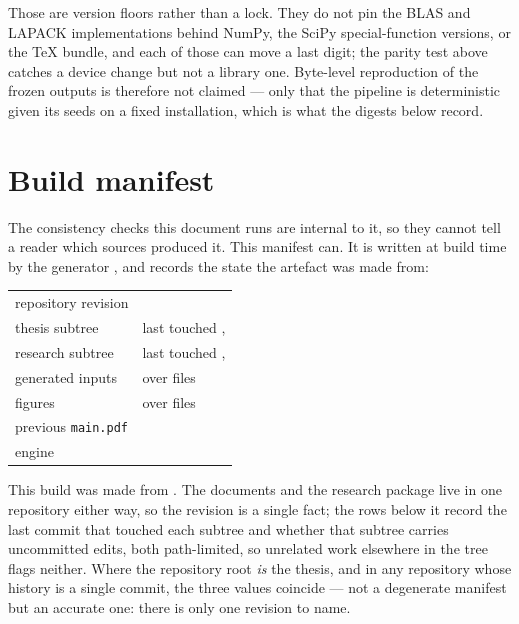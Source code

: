 Those are version floors rather than a lock. They do not pin the BLAS and
LAPACK implementations behind NumPy, the SciPy special-function versions, or
the \TeX{} bundle, and each of those can move a last digit; the parity test
above catches a device change but not a library one. Byte-level reproduction
of the frozen outputs is therefore not claimed --- only that the pipeline is
deterministic given its seeds on a fixed installation, which is what the
digests below record.

\section{Build manifest}

The consistency checks this document runs are internal to it, so they cannot
tell a reader which sources produced it. This manifest can. It is written at
build time by the generator
, and records the state
the artefact was made from:

\begin{center}
\begin{minipage}{\linewidth}\small
\begin{tabular}{@{}ll@{}}
\toprule
repository revision & \bmreposha{} \\
thesis subtree & last touched \bmthesissha{}, \bmthesisstate{} \\
research subtree & last touched \bmresearchsha{}, \bmresearchstate{} \\
generated inputs & \bmgenerated{} over \bmgeneratedcount{} files \\
figures & \bmfigures{} over \bmfigurecount{} files \\
previous \texttt{main.pdf} & \bmpdf{} \\
engine & \bmtectonic{} \\
\bottomrule
\end{tabular}
\end{minipage}
\end{center}

\noindent
This build was made from \bmlayout{}. The documents and the research package
live in one repository either way, so the revision is a single fact; the rows
below it record the last commit that touched each subtree and whether that
subtree carries uncommitted edits, both path-limited, so unrelated work
elsewhere in the tree flags neither. Where the repository root \emph{is} the
thesis, and in any repository whose history is a single commit, the three
values coincide --- not a degenerate manifest but an accurate one: there is
only one revision to name.

